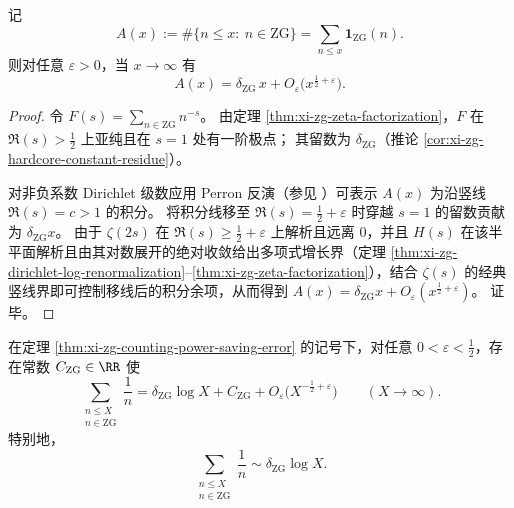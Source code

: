 
\begin{theorem}\label{thm:xi-zg-counting-power-saving-error}
记
\[
A(x):=\#\{n\le x:\ n\in\mathrm{ZG}\}
=\sum_{n\le x}\mathbf 1_{\mathrm{ZG}}(n).
\]
则对任意 \(\varepsilon>0\)，当 \(x\to\infty\) 有
\[
A(x)=\delta_{\mathrm{ZG}}\,x+O_\varepsilon\!\bigl(x^{\frac12+\varepsilon}\bigr).
\]
\end{theorem}

\begin{proof}
令 \(F(s)=\sum_{n\in\mathrm{ZG}}n^{-s}\)。
由定理 \ref{thm:xi-zg-zeta-factorization}，\(F\) 在 \(\Re(s)>\tfrac12\) 上亚纯且在 \(s=1\) 处有一阶极点；
其留数为 \(\delta_{\mathrm{ZG}}\)（推论 \ref{cor:xi-zg-hardcore-constant-residue}）。
\par
对非负系数 Dirichlet 级数应用 Perron 反演（参见 \cite{Apostol1976,Titchmarsh1986RiemannZeta}）可表示 \(A(x)\) 为沿竖线 \(\Re(s)=c>1\) 的积分。
将积分线移至 \(\Re(s)=\tfrac12+\varepsilon\) 时穿越 \(s=1\) 的留数贡献为 \(\delta_{\mathrm{ZG}}x\)。
由于 \(\zeta(2s)\) 在 \(\Re(s)\ge\tfrac12+\varepsilon\) 上解析且远离 \(0\)，并且 \(H(s)\) 在该半平面解析且由其对数展开的绝对收敛给出多项式增长界（定理 \ref{thm:xi-zg-dirichlet-log-renormalization}--\ref{thm:xi-zg-zeta-factorization}），结合 \(\zeta(s)\) 的经典竖线界即可控制移线后的积分余项，从而得到
\(
A(x)=\delta_{\mathrm{ZG}}x+O_\varepsilon(x^{\frac12+\varepsilon})
\)。
证毕。
\end{proof}

\begin{corollary}\label{cor:xi-zg-reciprocal-harmonic-asymptotic}
在定理 \ref{thm:xi-zg-counting-power-saving-error} 的记号下，对任意 \(0<\varepsilon<\tfrac12\)，存在常数 \(C_{\mathrm{ZG}}\in\RR\) 使
\[
\sum_{\substack{n\le X\\ n\in\mathrm{ZG}}}\frac{1}{n}
=\delta_{\mathrm{ZG}}\log X+C_{\mathrm{ZG}}+O_\varepsilon\!\bigl(X^{-\frac12+\varepsilon}\bigr)
\qquad(X\to\infty).
\]
特别地，
\[
\sum_{\substack{n\le X\\ n\in\mathrm{ZG}}}\frac{1}{n}
\sim \delta_{\mathrm{ZG}}\log X.
\]
\end{corollary}

